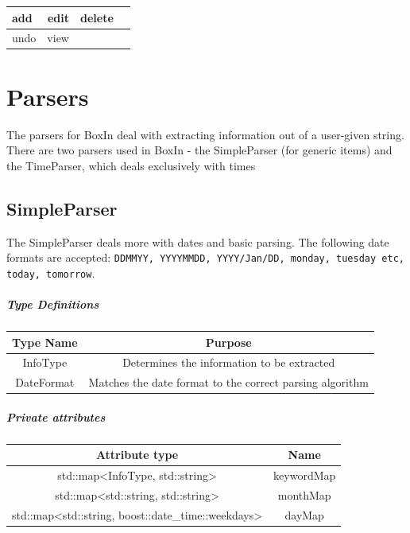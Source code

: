 \documentclass[12pt]{extarticle}
\begin{document}
\begin{center}
\begin{tabular}{  lrrl}
\hline
add & edit & delete\\
\hline
undo & view\\
\hline     
\end{tabular}
\end{center}

\newpage

\section{Parsers}
The parsers for BoxIn deal with extracting information out of a user-given string. There are two parsers used in BoxIn - the SimpleParser (for generic items) and the TimeParser, which deals exclusively with times

\subsection{SimpleParser}
The SimpleParser deals more with dates and basic parsing. The following date formats are accepted: \texttt{DDMMYY, YYYYMMDD, YYYY/Jan/DD, monday, tuesday etc, today, tomorrow}.\\

\subparagraph{Type Definitions}
\begin{tabular}{c c}
Type Name & Purpose\\
\hline
InfoType & Determines the information to be extracted\\
DateFormat & Matches the date format to the correct parsing algorithm\\
\end{tabular}

\subparagraph{Private attributes}
\begin{tabular}{c c}
Attribute type & Name\\
\hline
std::map<InfoType, std::string> & keywordMap\\
std::map<std::string, std::string> & monthMap\\
std::map<std::string, boost::date\_time::weekdays> & dayMap\\
\end{tabular}
\end{document}
